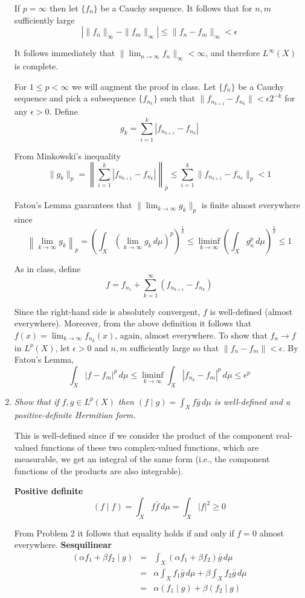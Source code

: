\documentclass[letterpaper,11pt]{article}
\begin{document}
\begin{enumerate}
If $p = \infty$ then let $\{f_n\}$ be a Cauchy sequence.  It follows that for $n,m$ sufficiently large
\[
\left| \|f_n\|_\infty - \|f_m\|_\infty \right| \leq \|f_n - f_m\|_\infty < \epsilon
\]

It follows immediately that $\|\lim_{n\rightarrow\infty} f_n\|_\infty < \infty$, and therefore $L^\infty(X)$ is complete.

For $1 \leq p < \infty$ we will augment the proof in class.  Let $\{f_n\}$ be a Cauchy sequence and pick a subsequence $\{f_{n_k}\}$ such that $\|f_{n_{k+1}} - f_{n_k}\| < \epsilon 2^{-k}$ for any $\epsilon > 0$.  Define
\[
g_k = \sum_{i=1}^k |f_{n_{k+1}} - f_{n_k}|
\]

From Minkowski's inequality
\[
\|g_k\|_p = \left\| \sum_{i=1}^k |f_{n_{k+1}} - f_{n_k}| \right\|_p \leq \sum_{i=1}^k \|f_{n_{k+1}} - f_{n_k}\|_p < 1
\]

Fatou's Lemma guarantees that $\|\lim_{k \rightarrow \infty} g_k\|_p$ is finite almost everywhere since
\[
\left\|\lim_{k \rightarrow \infty} g_k\right\|_p = \left(\int_X \left(\lim_{k \rightarrow \infty} g_k \,d\mu\right)^p \right)^{\frac{1}{p}} \leq \liminf_{k\rightarrow\infty} \left(\int_X g^p_n \,d\mu\right)^{\frac{1}{p}} \leq 1
\]

As in class, define
\[
f = f_{n_1} + \sum_{k=1}^\infty \left(f_{n_{k+1}} - f_{n_k}\right)
\]

Since the right-hand side is absolutely convergent, $f$ is well-defined (almost everywhere).  Moreover, from the above definition it follows that $f(x) = \lim_{k\rightarrow\infty} f_{n_k}(x)$, again, almost everywhere.  To show that $f_n \rightarrow f$ in $L^p(X)$, let $\epsilon > 0$ and $n,m$ sufficiently large so that $\|f_n - f_m\| < \epsilon$.  By Fatou's Lemma,
\[
\int_X |f - f_m|^p \,d\mu \leq \liminf_{k \rightarrow \infty} \int_X |f_{n_k} - f_m|^p \,d\mu \leq \epsilon^p
\]
\item \emph{Show that if $f,g \in L^p(X)$ then $(f \mid g) = \int_X f\bar{g} \,d\mu$ is well-defined and a positive-definite Hermitian form.}


This is well-defined since if we consider the product of the component real-valued functions of these two complex-valued functions, which are measurable, we get an integral of the same form (i.e., the component functions of the products are also integrable).

\textbf{Positive definite}
\[
(f \mid f ) = \int_X f \bar{f} \,d\mu = \int_X |f|^2 \geq 0
\]

From Problem 2 it follows that equality holds if and only if $f = 0$ almost everywhere.
\textbf{Sesquilinear}
\begin{eqnarray*}
(\alpha f_1 + \beta f_2 \mid g ) &=& \int_X (\alpha f_1 + \beta f_2)\bar{g} \,d\mu \\
&=& \alpha \int_X f_1 \bar{g} \,d\mu + \beta \int_X  f_2 \bar{g} \,d\mu \\
&=& \alpha(f_1 \mid g) + \beta(f_2 \mid g)
\end{eqnarray*}


\end{enumerate}
\end{document}
